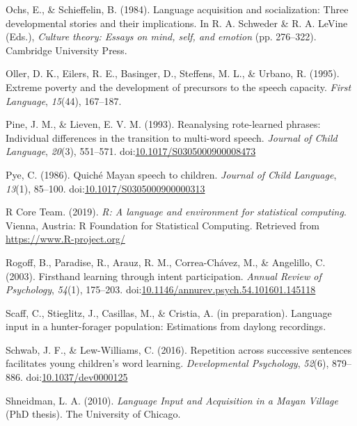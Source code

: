 \documentclass[,man,floatsintext]{apa6}
\begin{document}
\hypertarget{ref-ochs1984language}{}
Ochs, E., \& Schieffelin, B. (1984). Language acquisition and
socialization: Three developmental stories and their implications. In R.
A. Schweder \& R. A. LeVine (Eds.), \emph{Culture theory: Essays on
mind, self, and emotion} (pp. 276--322). Cambridge University Press.

\hypertarget{ref-oller1995extreme}{}
Oller, D. K., Eilers, R. E., Basinger, D., Steffens, M. L., \& Urbano,
R. (1995). Extreme poverty and the development of precursors to the
speech capacity. \emph{First Language}, \emph{15}(44), 167--187.

\hypertarget{ref-pine1993reanalysing}{}
Pine, J. M., \& Lieven, E. V. M. (1993). Reanalysing rote-learned
phrases: Individual differences in the transition to multi-word speech.
\emph{Journal of Child Language}, \emph{20}(3), 551--571.
doi:\href{https://doi.org/10.1017/S0305000900008473}{10.1017/S0305000900008473}

\hypertarget{ref-pye1986quiche}{}
Pye, C. (1986). Quiché Mayan speech to children. \emph{Journal of Child
Language}, \emph{13}(1), 85--100.
doi:\href{https://doi.org/10.1017/S0305000900000313}{10.1017/S0305000900000313}

\hypertarget{ref-R-base}{}
R Core Team. (2019). \emph{R: A language and environment for statistical
computing}. Vienna, Austria: R Foundation for Statistical Computing.
Retrieved from \url{https://www.R-project.org/}

\hypertarget{ref-rogoff2003firsthand}{}
Rogoff, B., Paradise, R., Arauz, R. M., Correa-Chávez, M., \& Angelillo,
C. (2003). Firsthand learning through intent participation. \emph{Annual
Review of Psychology}, \emph{54}(1), 175--203.
doi:\href{https://doi.org/10.1146/annurev.psych.54.101601.145118}{10.1146/annurev.psych.54.101601.145118}

\hypertarget{ref-scaffIPlanguage}{}
Scaff, C., Stieglitz, J., Casillas, M., \& Cristia, A. (in preparation).
Language input in a hunter-forager population: Estimations from daylong
recordings.

\hypertarget{ref-schwab2016repetition}{}
Schwab, J. F., \& Lew-Williams, C. (2016). Repetition across successive
sentences facilitates young children's word learning.
\emph{Developmental Psychology}, \emph{52}(6), 879--886.
doi:\href{https://doi.org/10.1037/dev0000125}{10.1037/dev0000125}

\hypertarget{ref-shneidman2010language}{}
Shneidman, L. A. (2010). \emph{Language Input and Acquisition in a Mayan
Village} (PhD thesis). The University of Chicago.
\end{document}
